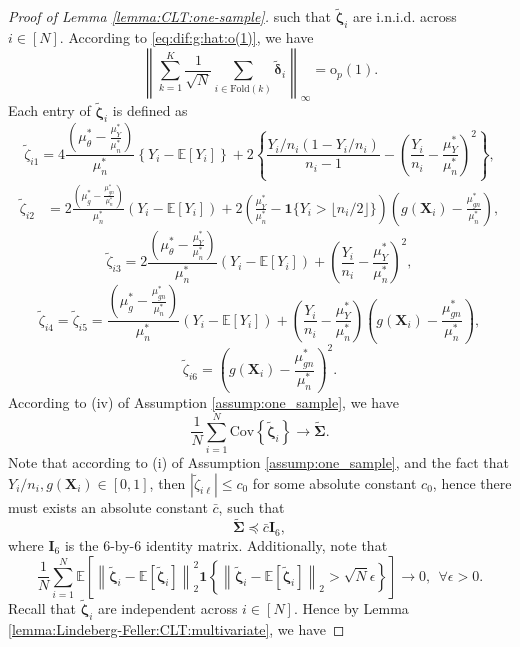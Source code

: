 \documentclass[12pt,letterpaper]{article}
\begin{document}
\begin{proof}[Proof of Lemma \ref{lemma:CLT:one-sample}]
such that $\tilde{\boldsymbol{\zeta}}_i$ are i.n.i.d. across $i\in[N]$. According to \eqref{eq:dif:g:hat:o(1)}, we have 
\begin{equation}\label{eq:vanish:delta}
\left\|\sum_{k=1}^K\frac{1}{\sqrt{N}}\sum_{i\in\textrm{Fold}(k)}\tilde{\boldsymbol{\delta}}_i\right\|_{\infty}=\mathrm{o}_p(1).
\end{equation}
Each entry of $\tilde{\boldsymbol{\zeta}}_i$ is defined as 
$$\tilde{\zeta}_{i1}=4\frac{\left(\mu_{\theta}^*-\frac{\mu_Y^*}{\mu_n^*}\right)}{\mu_n^*}\left\{Y_i-\mathbb{E}[Y_i]\right\}+2\left\{\frac{Y_i/n_i(1-Y_i/n_i)}{n_i-1}-\left(\frac{Y_i}{n_i}-\frac{\mu_Y^*}{\mu_n^*}\right)^2\right\},$$
$$\begin{array}{rl}
\tilde{\zeta}_{i2}\!\!\!\!&\displaystyle=2\frac{\left(\mu_g^*-\frac{\mu_{gn}^*}{\mu_n^*}\right)}{\mu_n^*}(Y_i-\mathbb{E}[Y_i])+2\left(\frac{\mu_Y^*}{\mu_n^*}-\mathbf{1}\{Y_i>\lfloor n_i/2\rfloor\}\right)\left(g(\mathbf{X}_i)-\frac{\mu_{gn}^*}{\mu_n^*}\right),
\end{array}$$
$$\tilde{\zeta}_{i3}=2\frac{\left(\mu_{\theta}^*-\frac{\mu_Y^*}{\mu_n^*}\right)}{\mu_n^*}(Y_i-\mathbb{E}[Y_i])+\left(\frac{Y_i}{n_i}-\frac{\mu_Y^*}{\mu_n^*}\right)^2,$$
$$\tilde{\zeta}_{i4}=\tilde{\zeta}_{i5}=\frac{\left(\mu_g^*-\frac{\mu_{gn}^*}{\mu_n^*}\right)}{\mu_n^*}(Y_i-\mathbb{E}[Y_i])+\left(\frac{Y_i}{n_i}-\frac{\mu_Y^*}{\mu_n^*}\right)\left(g(\mathbf{X}_i)-\frac{\mu_{gn}^*}{\mu_n^*}\right),$$
$$\tilde{\zeta}_{i6}=\left(g(\mathbf{X}_i)-\frac{\mu_{gn}^*}{\mu_n^*}\right)^2.$$
According to (iv) of Assumption \ref{assump:one_sample}, we have 
$$\frac{1}{N}\sum_{i=1}^N\mathrm{Cov}\left\{\tilde{\boldsymbol{\zeta}}_i\right\}\rightarrow\widetilde{\boldsymbol{\Sigma}}.$$
Note that according to (i) of Assumption \ref{assump:one_sample}, and the fact that $Y_i/n_i, g(\mathbf{X}_i)\in[0,1]$, then $|\tilde{\zeta}_{i\ell}|\leq c_0$ for some absolute constant $c_0$, hence there must exists an absolute constant $\bar{c}$, such that 
$$\widetilde{\boldsymbol{\Sigma}}\preceq\bar{c}\mathbf{I}_6,$$
where $\mathbf{I}_6$ is the $6$-by-$6$ identity matrix. Additionally, note that 
$$\frac{1}{N}\sum_{i=1}^N\mathbb{E}\left[\left\|\tilde{\boldsymbol{\zeta}}_i-\mathbb{E}\left[\tilde{\boldsymbol{\zeta}}_i\right]\right\|_2^2\mathbf{1}\left\{\left\|\tilde{\boldsymbol{\zeta}}_i-\mathbb{E}\left[\tilde{\boldsymbol{\zeta}}_i\right]\right\|_2>\sqrt{N}\epsilon\right\}\right]\rightarrow0,\ \ \forall \epsilon>0.$$
Recall that $\tilde{\boldsymbol{\zeta}}_i$ are independent across $i\in[N]$. Hence by Lemma \ref{lemma:Lindeberg-Feller:CLT:multivariate}, we have 

\end{proof}
\end{document}
